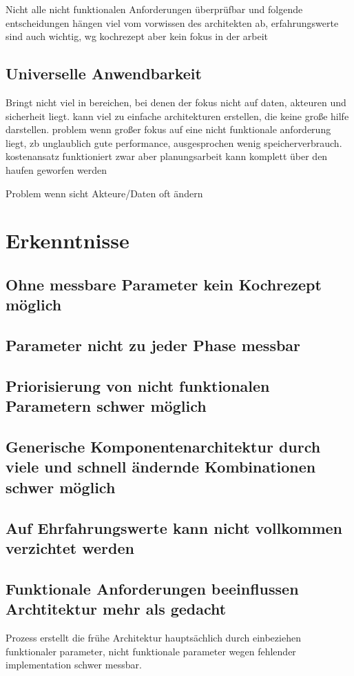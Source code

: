 Nicht alle nicht funktionalen Anforderungen überprüfbar und folgende entscheidungen hängen viel vom vorwissen des architekten ab, erfahrungswerte sind auch wichtig, wg kochrezept aber kein fokus in der arbeit


\subsection{Universelle Anwendbarkeit}
Bringt nicht viel in bereichen, bei denen der fokus nicht auf daten, akteuren und sicherheit liegt. kann viel zu einfache architekturen erstellen, die keine große hilfe darstellen. problem wenn großer fokus auf eine nicht funktionale anforderung liegt, zb unglaublich gute performance, ausgesprochen wenig speicherverbrauch. kostenansatz funktioniert zwar aber planungsarbeit kann komplett über den haufen geworfen werden

Problem wenn sicht Akteure/Daten oft ändern

\section{Erkenntnisse}
\subsection{Ohne messbare Parameter kein Kochrezept möglich}
\subsection{Parameter nicht zu jeder Phase messbar}
\subsection{Priorisierung von nicht funktionalen Parametern schwer möglich}
\subsection{Generische Komponentenarchitektur durch viele und schnell ändernde Kombinationen schwer möglich}
\subsection{Auf Ehrfahrungswerte kann nicht vollkommen verzichtet werden}
\subsection{Funktionale Anforderungen beeinflussen Archtitektur mehr als gedacht}
Prozess erstellt die frühe Architektur hauptsächlich durch einbeziehen funktionaler parameter, nicht funktionale parameter wegen fehlender implementation schwer messbar.

